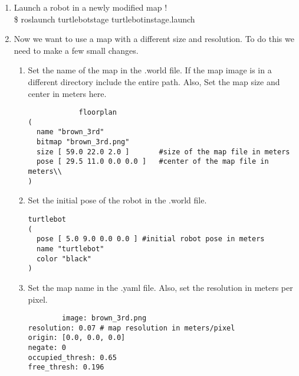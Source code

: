 \documentclass[12pt]{article}
\newcommand{\R}{\color{red}}
\newcommand{\B}{\color{blue}}
\newcommand{\K}{\color{black}}
\newcommand{\G}{\color{mygreen}}
\newcommand{\pkgname}{\G<package\_name>\K}
\newcommand{\wspname}{\R<workspace\_name>\K}
\newcommand{\usrname}{\B<user\_name>\K}
\begin{document}
\begin{enumerate}
		{\selectfont  
        \$ export TURTLEBOT\textunderscore STAGE\textunderscore MAP\textunderscore FILE=\\''/home/\usrname/\wspname/src/\pkgname/maps/new\textunderscore maze.yaml}"
        
		{\selectfont 
        \$ export TURTLEBOT\textunderscore STAGE\textunderscore WORLD\textunderscore FILE=\\"/home/\usrname/\wspname/src/\pkgname/maps/new\textunderscore maze.world}"
        
    \item Launch a robot in a newly modified map !   \vspace{1mm}\\
		{\selectfont   
        \$ roslaunch turtlebot\textunderscore stage turtlebot\textunderscore in\textunderscore stage.launch }

    

\newpage

 \item Now we want to use a map with a different size and resolution. To do this we need to make a few small changes.\\   
	\begin{enumerate}
		
		\item Set the name of the map in the .world file. If the map image is in a different directory include the entire path. Also, Set the map size and center in meters here. 
		
			       \begin{verbatim}
			floorplan
(
  name "brown_3rd"
  bitmap "brown_3rd.png"
  size [ 59.0 22.0 2.0 ]       #size of the map file in meters 
  pose [ 29.5 11.0 0.0 0.0 ]   #center of the map file in meters\\
)
\end{verbatim}
	\item Set the initial pose of the robot in the .world file.
		
			       \begin{verbatim}
turtlebot
(
  pose [ 5.0 9.0 0.0 0.0 ] #initial robot pose in meters
  name "turtlebot"
  color "black"
)
\end{verbatim}	  	
		\item Set the map name  in the .yaml file. Also, set the resolution in meters per pixel.
		\begin{verbatim}
		image: brown_3rd.png
resolution: 0.07 # map resolution in meters/pixel
origin: [0.0, 0.0, 0.0]
negate: 0
occupied_thresh: 0.65
free_thresh: 0.196
		\end{verbatim}	 
		

\end{enumerate}
\end{enumerate}
\end{document}
